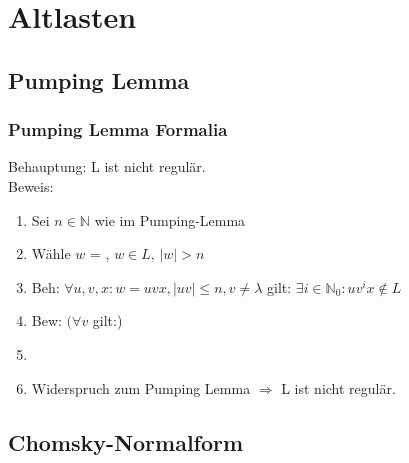 


\section{Altlasten}
\subsection{Pumping Lemma}
\begin{frame}
	\frametitle{Pumping Lemma Formalia}
	Behauptung: L ist nicht regulär. ~\\
	Beweis:
	\begin{enumerate}
		\item[]Sei $n \in \mathbb{N}$ wie im Pumping-Lemma
		\item[]Wähle $w$ = \underline{\hspace{1.5 cm}}, $w \in L$, $|w| > n$
		\item[]Beh: $\forall u,v,x: w = uvx, |uv| \leq n, v \neq \lambda$ gilt: $\exists i \in \mathbb{N}_0: uv^ix \notin L$
		\item[] Bew: $(\forall v$ gilt:)\underline{\hspace{4.5 cm}}
		\item[] \hspace*{0.85 cm} \underline{\hspace{5.75 cm}}
		\item[] Widerspruch zum Pumping Lemma $\Rightarrow$ L ist nicht regulär.
	\end{enumerate}
\end{frame}

\subsection{Chomsky-Normalform}

